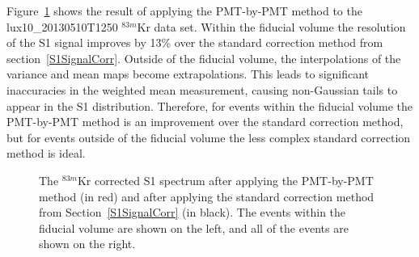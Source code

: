 Figure~\ref{PMTxPMTResult} shows the result of applying the PMT-by-PMT method to the lux10\_20130510T1250 $^{83m}$Kr data set.  Within the fiducial volume the resolution of the S1 signal improves by 13\% over the standard correction method from section~\ref{S1SignalCorr}.  Outside of the fiducial volume, the interpolations of the variance and mean maps become extrapolations.  This leads to significant inaccuracies in the weighted mean measurement, causing non-Gaussian tails to appear in the S1 distribution.  Therefore, for events within the fiducial volume the PMT-by-PMT method is an improvement over the standard correction method, but for events outside of the fiducial volume the less complex standard correction method is ideal.


\begin{figure} [h!]
\centering
{}
\qquad
{}
\caption{ The $^{83m}$Kr corrected S1 spectrum after applying the PMT-by-PMT method (in red) and after applying the standard correction method from Section~\ref{S1SignalCorr} (in black).  The events within the fiducial volume are shown on the left, and all of the events are shown on the right.}
\label{PMTxPMTResult}
\end{figure}
